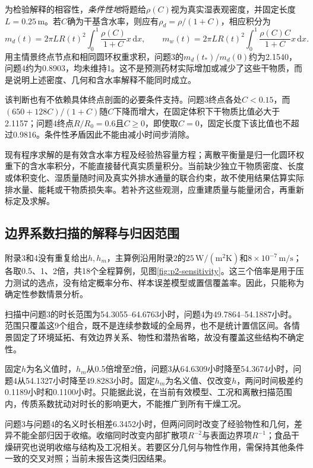 \documentclass[UTF8,12pt,a4paper]{ctexart}
\newcommand{\dd}{\,\mathrm d}
\begin{document}
为检验解释的相容性，\emph{条件性地}将题给$\rho(C)$视为真实湿表观密度，并固定长度$L=0.25\,\mathrm m$。若$C$确为干基含水率，则应有$\rho_d=\rho/(1+C)$，相应积分为
\begin{equation}
m_d(t)=2\pi LR(t)^2\int_0^1\frac{\rho(C)}{1+C}x\dd x,\qquad
m_w(t)=2\pi LR(t)^2\int_0^1\frac{\rho(C)C}{1+C}x\dd x.
\end{equation}
用主情景终点节点和相同圆环权重求积，问题3的$m_d(t_*)/m_d(0)$约为2.1540，问题4约为0.8903，均未维持1。这不是预测药材实际增加或减少了这些干物质，而是说明上述密度、几何和含水率解释不能同时成立。

该判断也有不依赖具体终点剖面的必要条件支持。问题3终点各处$C<0.15$，而$(650+128C)/(1+C)$随$C$下降而增大，在固定体积下干物质比值必大于2.1157；问题4终点$R/R_0=0.6$且$C\ge0$，即使取$C=0$，固定长度下该比值也不超过0.9816。条件性矛盾因此不能由减小时间步消除。

现有程序求解的是有效含水率方程及经验热容量方程；离散平衡量是归一化圆环权重下的含水率积分，不能直接替代真实质量积分。当前缺少独立干物质密度、长度或体积变化、湿质量随时间及真实外排水通量的联合约束，故不使用结果估算实际排水量、能耗或干物质损失率。若补齐这些观测，应重建质量与能量闭合，再重新标定及求解。

\subsection{边界系数扫描的解释与归因范围}
附录3和4没有重复给出$h,h_m$，主算例沿用附录2的$25\,\mathrm{W/(m^2K)}$和$8\times10^{-7}\,\mathrm{m/s}$；各取0.5、1、2倍，共18个全程算例，见图\ref{fig:p2-sensitivity}。这三个倍率是用于压力测试的选点，没有给定概率分布、样本误差模型或置信覆盖率。因此，只能称为确定性参数情景分析。

扫描中问题3的时长范围为54.3055--64.6763小时，问题4为49.7864--54.1887小时。范围只覆盖这9个组合，既不是连续参数域的全局界，也不是统计置信区间。各情景固定了环境延拓、有效边界关系、物性和潜热省略，故没有覆盖这些结构不确定性。

固定$h$为名义值时，$h_m$从0.5倍增至2倍，问题3从64.6309小时降至54.3674小时，问题4从54.1327小时降至49.8283小时。固定$h_m$为名义值、仅改变$h$，两问时间极差约0.1189小时和0.1100小时。只能据此说，在当前有效模型、工况和离散扫描范围内，传质系数扰动对时长的影响更大，不能推广到所有干燥工况。

问题3与问题4的名义时长相差6.3452小时，但两问同时改变了经验物性和几何，差异不能全部归因于收缩。收缩同时改变内部扩散项$R^{-2}$与表面边界项$R^{-1}$；食品干燥研究也说明收缩与结构及工况相关\cite{ramallo2011,mahiuddin2018}。若要区分几何与物性作用，需保持其他条件一致的交叉对照；当前未报告这类归因结果。
\end{document}
